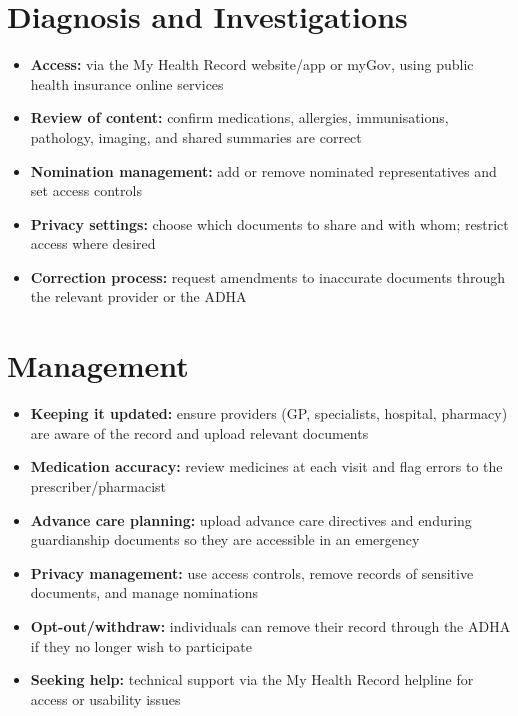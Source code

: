 \section*{Diagnosis and Investigations}
\begin{itemize}
    \item \textbf{Access:} via the My Health Record website/app or myGov, using public health insurance online services
    \item \textbf{Review of content:} confirm medications, allergies, immunisations, pathology, imaging, and shared summaries are correct
    \item \textbf{Nomination management:} add or remove nominated representatives and set access controls
    \item \textbf{Privacy settings:} choose which documents to share and with whom; restrict access where desired
    \item \textbf{Correction process:} request amendments to inaccurate documents through the relevant provider or the ADHA
\end{itemize}

\section*{Management}
\begin{itemize}
    \item \textbf{Keeping it updated:} ensure providers (GP, specialists, hospital, pharmacy) are aware of the record and upload relevant documents
    \item \textbf{Medication accuracy:} review medicines at each visit and flag errors to the prescriber/pharmacist
    \item \textbf{Advance care planning:} upload advance care directives and enduring guardianship documents so they are accessible in an emergency
    \item \textbf{Privacy management:} use access controls, remove records of sensitive documents, and manage nominations
    \item \textbf{Opt-out/withdraw:} individuals can remove their record through the ADHA if they no longer wish to participate
    \item \textbf{Seeking help:} technical support via the My Health Record helpline for access or usability issues
\end{itemize}

